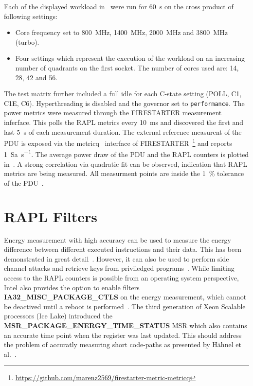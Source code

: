 Each of the displayed workload in~ were run for \SI{60}{\second} on the cross product of following settings:
\begin{itemize}
    \item Core frequency set to \SI{800}{\MHz}, \SI{1400}{\MHz}, \SI{2000}{\MHz} and \SI{3800}{\MHz} (turbo).
    \item Four settings which represent the execution of the workload on an increasing number of quadrants on the first socket.
    The number of cores used are: \SI{14}{}, \SI{28}{}, \SI{42}{} and \SI{56}{}.
\end{itemize}
The test matrix further included a full idle for each C-state setting (POLL, C1, C1E, C6).
Hyperthreading is disabled and the governor set to \texttt{performance}.
The power metrics were measured through the FIRESTARTER measurement inferface.
This polls the RAPL metrics every \SI{10}{\ms} and discovered the first and last \SI{5}{\second} of each measurement duration.
The external reference measurent of the PDU is exposed via the metricq~\cite{Ilsche_2019_MetricQ} interface of FIRESTARTER~\footnote{\url{https://github.com/marenz2569/firestarter-metric-metricq}} and reports \SI{1}{Sa\per\second}.
The average power draw of the PDU and the RAPL counters is plotted in~.
A strong correlation via quadratic fit can be observed, indication that RAPL metrics are being measured.
All measurment points are inside the \SI{1}{\percent} tolerance of the PDU~\cite{Raritan_PX2_5528}.

\section{RAPL Filters}

Energy measurement with high accuracy can be used to measure the energy difference between different executed instructions and their data.
This has been demonstrated in great detail~\cite{Lucas_2016_AluPower,Schoene_2024_Alder_Lake,Schoene_2021_Zen2}.
However, it can also be used to perform side channel attacks and retrieve keys from priviledged programs~\cite{Lipp_2021_Platypus}.
While limiting access to the RAPL counters is possible from an operating system perspective, Intel also provides the option to enable filters \textbf{IA32\_MISC\_PACKAGE\_CTLS} on the energy measurement, which cannot be deactived until a reboot is performed~\cite[Vol. 4 Table 2-52]{intel_combined_software_developer_manual}.
The third generation of Xeon Scalable processors (Ice Lake) introduced the \textbf{MSR\_PACKAGE\_ENERGY\_TIME\_STATUS} MSR which also contains an accurate time point when the register was last updated.
This should address the problem of accuratly measuring short code-paths as presented by Hähnel et al.~\cite{Haehnel_2012_RAPL}.

